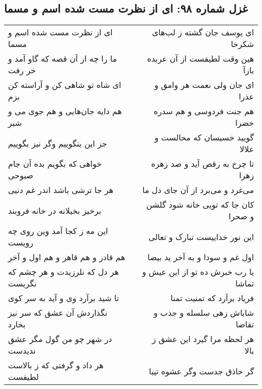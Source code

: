 \begin{center}
\section*{غزل شماره ۹۸: ای از نظرت مست شده اسم و مسما}
\label{sec:0098}
\begin{longtable}{l p{0.5cm} r}
ای از نظرت مست شده اسم و مسما
&&
ای یوسف جان گشته ز لب‌های شکرخا
\\
ما را چه از آن قصه که گاو آمد و خر رفت
&&
هین وقت لطیفست از آن عربده بازآ
\\
ای شاه تو شاهی کن و آراسته کن بزم
&&
ای جان ولی نعمت هر وامق و عذرا
\\
هم دایه جان‌هایی و هم جوی می و شیر
&&
هم جنت فردوسی و هم سدره خضرا
\\
جز این بنگوییم وگر نیز بگوییم
&&
گویید خسیسان که محالست و علالا
\\
خواهی که بگویم بده آن جام صبوحی
&&
تا چرخ به رقص آید و صد زهره زهرا
\\
هر جا ترشی باشد اندر غم دنیی
&&
می‌غرد و می‌برد از آن جای دل ما
\\
برخیز بخیلانه در خانه فروبند
&&
کان جا که تویی خانه شود گلشن و صحرا
\\
این مه ز کجا آمد وین روی چه رویست
&&
این نور خداییست تبارک و تعالی
\\
هم قادر و هم قاهر و هم اول و آخر
&&
اول غم و سودا و به آخر ید بیضا
\\
هر دل که نلرزیدت و هر چشم که نگریست
&&
یا رب خبرش ده تو از این عیش و تماشا
\\
تا شید برآرد وی و آید به سر کوی
&&
فریاد برآرد که تمنیت تمنا
\\
نگذاردش آن عشق که سر نیز بخارد
&&
شاباش زهی سلسله و جذب و تقاضا
\\
در شهر چو من گول مگر عشق ندیدست
&&
هر لحظه مرا گیرد این عشق ز بالا
\\
هر داد و گرفتی که ز بالاست لطیفست
&&
گر حاذق جدست وگر عشوه تیبا
\\
\end{longtable}
\end{center}
